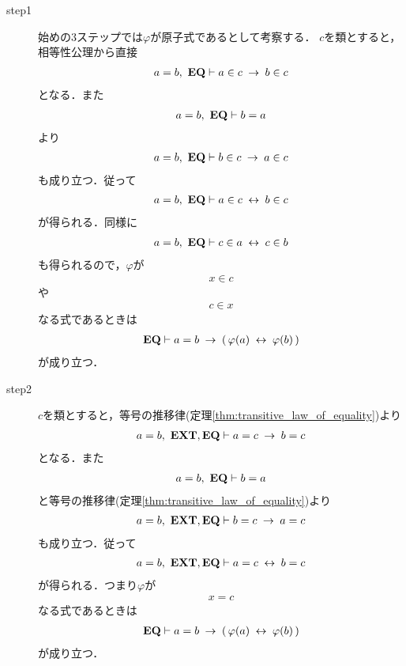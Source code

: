 	\begin{sketch}\mbox{}
		\begin{description}
			\item[step1]
				始めの$3$ステップでは$\varphi$が原子式であるとして考察する．
				$c$を類とすると，相等性公理から直接
				\begin{align}
					a = b,\ \mbox{{\bf EQ}} \vdash a \in c \hspace{0.25em}\rightarrow\hspace{0.25em} b \in c
				\end{align}
				となる．また
				\begin{align}
					a = b,\ \mbox{{\bf EQ}} \vdash b = a
				\end{align}
				より
				\begin{align}
					a = b,\ \mbox{{\bf EQ}} \vdash b \in c \hspace{0.25em}\rightarrow\hspace{0.25em} a \in c
				\end{align}
				も成り立つ．従って
				\begin{align}
					a = b,\ \mbox{{\bf EQ}} \vdash a \in c \hspace{0.25em}\leftrightarrow\hspace{0.25em} b \in c
				\end{align}
				が得られる．同様に
				\begin{align}
					a = b,\ \mbox{{\bf EQ}} \vdash c \in a \hspace{0.25em}\leftrightarrow\hspace{0.25em} c \in b
				\end{align}
				も得られるので，$\varphi$が
				\begin{align}
					x \in c
				\end{align}
				や
				\begin{align}
					c \in x
				\end{align}
				なる式であるときは
				\begin{align}
					\mbox{{\bf EQ}} \vdash a = b \hspace{0.25em}\rightarrow\hspace{0.25em} (\, \varphi(a) \hspace{0.25em}\leftrightarrow\hspace{0.25em} \varphi(b)\, )
				\end{align}
				が成り立つ．
			
			\item[step2]
				$c$を類とすると，等号の推移律(定理\ref{thm:transitive_law_of_equality})より
				\begin{align}
					a = b,\ \mbox{{\bf EXT}},\mbox{{\bf EQ}} \vdash a = c \hspace{0.25em}\rightarrow\hspace{0.25em} b = c
				\end{align}
				となる．また
				\begin{align}
					a = b,\ \mbox{{\bf EQ}} \vdash b = a
				\end{align}
				と等号の推移律(定理\ref{thm:transitive_law_of_equality})より
				\begin{align}
					a = b,\ \mbox{{\bf EXT}},\mbox{{\bf EQ}} \vdash b = c \hspace{0.25em}\rightarrow\hspace{0.25em} a = c
				\end{align}
				も成り立つ．従って
				\begin{align}
					a = b,\ \mbox{{\bf EXT}},\mbox{{\bf EQ}} \vdash a = c \hspace{0.25em}\leftrightarrow\hspace{0.25em} b = c
				\end{align}
				が得られる．つまり$\varphi$が
				\begin{align}
					x = c
				\end{align}
				なる式であるときは
				\begin{align}
					\mbox{{\bf EQ}} \vdash a = b \hspace{0.25em}\rightarrow\hspace{0.25em} (\, \varphi(a) \hspace{0.25em}\leftrightarrow\hspace{0.25em} \varphi(b)\, )
				\end{align}
				が成り立つ．
				

\end{description}
\end{sketch}
